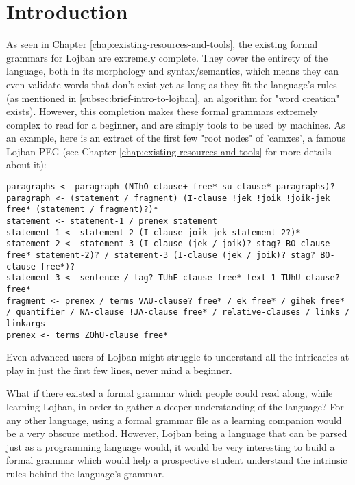 \chapter{Introduction}

\vspace{0.5cm}

As seen in Chapter \ref{chap:existing-resources-and-tools}, the existing formal grammars for Lojban are extremely complete.
They cover the entirety of the language, both in its morphology and syntax/semantics, which means they can even validate words that don't exist yet
as long as they fit the language's rules (as mentioned in \ref{subsec:brief-intro-to-lojban}, an algorithm for "word creation" exists).
However, this completion makes these formal grammars extremely complex to read for a beginner, and are simply tools to be used by machines.
As an example, here is an extract of the first few "root nodes" of 'camxes', a famous Lojban PEG (see Chapter \ref{chap:existing-resources-and-tools}
for more details about it):

\begin{lstlisting}[caption=Extract of 'camxes' - a famous Lojban PEG]
paragraphs <- paragraph (NIhO-clause+ free* su-clause* paragraphs)?
paragraph <- (statement / fragment) (I-clause !jek !joik !joik-jek free* (statement / fragment)?)*
statement <- statement-1 / prenex statement
statement-1 <- statement-2 (I-clause joik-jek statement-2?)*
statement-2 <- statement-3 (I-clause (jek / joik)? stag? BO-clause free* statement-2)? / statement-3 (I-clause (jek / joik)? stag? BO-clause free*)?
statement-3 <- sentence / tag? TUhE-clause free* text-1 TUhU-clause? free*
fragment <- prenex / terms VAU-clause? free* / ek free* / gihek free* / quantifier / NA-clause !JA-clause free* / relative-clauses / links / linkargs
prenex <- terms ZOhU-clause free*
\end{lstlisting}

\newpage

Even advanced users of Lojban might struggle to understand all the intricacies at play in just the first few lines, never mind a beginner.\newline

What if there existed a formal grammar which people could read along, while learning Lojban, in order to gather a deeper
understanding of the language? For any other language, using a formal grammar file as a learning companion would be a very obscure method.
However, Lojban being a language that can be parsed just as a programming language would, it would be very interesting to build a formal grammar
which would help a prospective student understand the intrinsic rules behind the language's grammar. \newline

